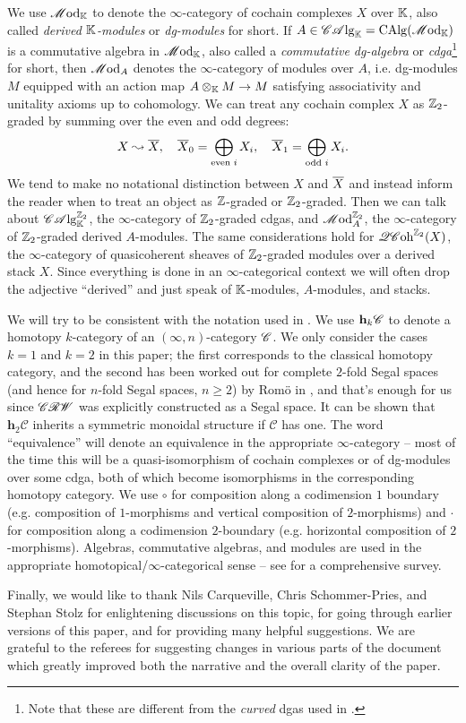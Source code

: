 We use $\mathscr{M}\mathrm{od}_{\mathbb{K}}$ to denote the $\infty$-category of cochain complexes $X$ over $\mathbb{K}$, also called \emph{derived $\mathbb{K}$-modules} or \emph{dg-modules} for short. If $A \in \mathscr{CA}\mathrm{lg}_{\mathbb{K}} = \mathrm{CAlg}(\mathscr{M}\mathrm{od}_{\mathbb{K}})$ is a commutative algebra in $\mathscr{M}\mathrm{od}_{\mathbb{K}}$, also called a \emph{commutative dg-algebra} or \emph{cdga}\footnote{Note that these are different from the \emph{curved} dgas used in \cite{KR2008}.} for short, then $\mathscr{M}\mathrm{od}_A$ denotes the $\infty$-category of modules over $A$, i.e. dg-modules $M$ equipped with an action map $A \otimes_{\mathbb{K}} M \to M$ satisfying associativity and unitality axioms up to cohomology. We can treat any cochain complex $X$ as $\mathbb{Z}_2$-graded by summing over the even and odd degrees:
\begin{equation*}
	X \leadsto \overline{X}, \quad \overline{X}_0 = \bigoplus_{\text{even } i} X_i, \quad \overline{X}_1 = \bigoplus_{\text{odd } i} X_i.
\end{equation*}
We tend to make no notational distinction between $X$ and $\overline{X}$ and instead inform the reader when to treat an object as $\mathbb{Z}$-graded or $\mathbb{Z}_2$-graded. Then we can talk about $\mathscr{CA}\mathrm{lg}_{\mathbb{K}}^{\mathbb{Z}_2}$, the $\infty$-category of $\mathbb{Z}_2$-graded cdgas, and $\mathscr{M}\mathrm{od}_A^{\mathbb{Z}_2}$, the $\infty$-category of $\mathbb{Z}_2$-graded derived $A$-modules. The same considerations hold for $\mathscr{QC}\mathrm{oh}^{\mathbb{Z}_2}(X)$, the $\infty$-category of quasicoherent sheaves of $\mathbb{Z}_2$-graded modules over a derived stack $X$. Since everything is done in an $\infty$-categorical context we will often drop the adjective ``derived'' and just speak of $\mathbb{K}$-modules, $A$-modules, and stacks.

We will try to be consistent with the notation used in \cite{Riva2024}. We use $\mathbf{h}_k \mathscr{C}$ to denote a homotopy $k$-category of an $(\infty,n)$-category $\mathscr{C}$. We only consider the cases $k = 1$ and $k = 2$ in this paper; the first corresponds to the classical homotopy category, and the second has been worked out for complete $2$-fold Segal spaces (and hence for $n$-fold Segal spaces, $n \geq 2$) by Rom\"o in \cite{Romo2023}, and that's enough for us since $\mathscr{CRW}$ was explicitly constructed as a Segal space. It can be shown that $\mathbf{h}_2 \mathscr{C}$ inherits a symmetric monoidal structure if $\mathscr{C}$ has one. The word ``equivalence'' will denote an equivalence in the appropriate $\infty$-category -- most of the time this will be a quasi-isomorphism of cochain complexes or of dg-modules over some cdga, both of which become isomorphisms in the corresponding homotopy category. We use $\circ$ for composition along a codimension $1$ boundary (e.g. composition of $1$-morphisms and vertical composition of $2$-morphisms) and $\cdot$ for composition along a codimension $2$-boundary (e.g. horizontal composition of $2$-morphisms). Algebras, commutative algebras, and modules are used in the appropriate homotopical/$\infty$-categorical sense -- see \cite{HA2017} for a comprehensive survey.

Finally, we would like to thank Nils Carqueville, Chris Schommer-Pries, and Stephan Stolz for enlightening discussions on this topic, for going through earlier versions of this paper, and for providing many helpful suggestions. We are grateful to the referees for suggesting changes in various parts of the document which greatly improved both the narrative and the overall clarity of the paper. 
